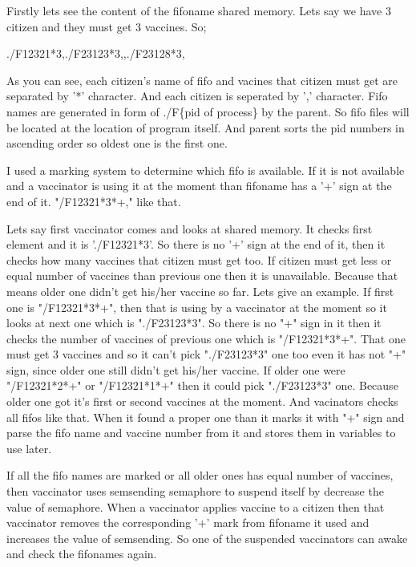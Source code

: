 \documentclass{article}
\begin{document}
\par\hspace{\parindent}Firstly lets see the content of the fifoname shared memory. Lets say we have 3 citizen and they must get 3 vaccines. So;
\newline
\par./F12321*3,./F23123*3,,./F23128*3,
\newline
\par As you can see, each citizen's name of fifo and vacines that citizen must get are separated by '*' character. And each citizen is seperated by ',' character. Fifo names are generated in form of ./F\{pid of process\} by the parent. So fifo files will be located at the location of program itself. And parent sorts the pid numbers in ascending order so oldest one is the first one.
\newline
\par I used a marking system to determine which fifo is available. If it is not available and a vaccinator is using it at the moment than fifoname has a '+' sign at the end of it. "/F12321*3*+," like that. 
\newline
\par Lets say first vaccinator comes and looks at shared memory. It checks first element and it is './F12321*3'. So there is no '+' sign at the end of it, then it checks how many vaccines that citizen must get too. If citizen must get less or equal number of vaccines than previous one then it is unavailable. Because that means older one didn't get his/her vaccine so far. Lets give an example. If first one is "/F12321*3*+", then that is using by a vaccinator at the moment so it looks at next one which is "./F23123*3". So there is no "+" sign in it then it checks the number of vaccines of previous one which is "/F12321*3*+". That one must get 3 vaccines and so it can't pick "./F23123*3" one too even it has not "+" sign, since older one still didn't get his/her vaccine. If older one were "/F12321*2*+" or "/F12321*1*+" then it could pick "./F23123*3" one. Because older one got it's first or second vaccines at the moment. And vacinators checks all fifos like that. When it found a proper one than it marks it with "+" sign and parse the fifo name and vaccine number from it and stores them in variables to use later.
\\
\par If all the fifo names are marked or all older ones has equal number of vaccines, then vaccinator uses sem\textunderscore sending semaphore to suspend itself by decrease the value of semaphore. When a vaccinator applies vaccine to a citizen then that vaccinator removes the corresponding '+' mark from fifoname it used and increases the value of sem\textunderscore sending. So one of the suspended vaccinators can awake and check the fifonames again.
\end{document}
